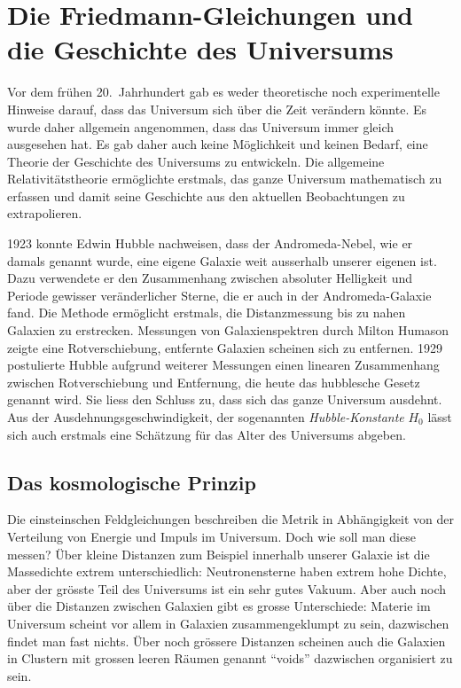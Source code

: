 %
%
\section{Die Friedmann-Gleichungen und die Geschichte des Universums
\label{buch:kruemmung:section:friedmann}}
%
Vor dem frühen 20.~Jahrhundert gab es weder theoretische noch experimentelle
Hinweise darauf, dass das Universum sich über die Zeit verändern könnte.
Es wurde daher allgemein angenommen, dass das Universum immer gleich
ausgesehen hat.
Es gab daher auch keine Möglichkeit und keinen Bedarf, eine Theorie der
Geschichte des Universums zu entwickeln.
Die allgemeine Relativitätstheorie ermöglichte erstmals, das ganze
Universum mathematisch zu erfassen und damit seine Geschichte aus
den aktuellen Beobachtungen zu extrapolieren.

1923 konnte Edwin Hubble nachweisen, dass der Andromeda-Nebel, wie
%
er damals genannt wurde, eine eigene Galaxie weit ausserhalb unserer
eigenen ist.
Dazu verwendete er den Zusammenhang zwischen absoluter Helligkeit
und Periode gewisser veränderlicher Sterne, die er auch in der
Andromeda-Galaxie fand.
%
Die Methode ermöglicht erstmals, die Distanzmessung bis zu nahen Galaxien
zu erstrecken.
Messungen von Galaxienspektren durch Milton Humason 
%
zeigte eine Rotverschiebung, entfernte Galaxien scheinen sich zu
%
entfernen.
1929 postulierte Hubble aufgrund weiterer Messungen einen linearen
Zusammenhang zwischen Rotverschiebung und Entfernung, die heute
das hubblesche Gesetz genannt wird.
%
%
Sie liess den Schluss zu, dass sich das ganze Universum ausdehnt.
Aus der Ausdehnungsgeschwindigkeit, der sogenannten 
\emph{Hubble-Konstante} $H_0$
%
lässt sich auch erstmals eine Schätzung für das Alter des Universums
abgeben.

%
%
\subsection{Das kosmologische Prinzip}
Die einsteinschen Feldgleichungen beschreiben die Metrik in Abhängigkeit
von der Verteilung von Energie und Impuls im Universum.
Doch wie soll man diese messen?
Über kleine Distanzen zum Beispiel innerhalb unserer Galaxie ist die
Massedichte extrem unterschiedlich:
Neutronensterne haben extrem hohe Dichte, aber der grösste Teil des
Universums ist ein sehr gutes Vakuum.
Aber auch noch über die Distanzen zwischen Galaxien gibt es grosse
Unterschiede: Materie im Universum scheint vor allem in Galaxien
zusammengeklumpt zu sein, dazwischen findet man fast nichts.
Über noch grössere Distanzen scheinen auch die Galaxien in Clustern
mit grossen leeren Räumen genannt ``voids'' dazwischen organisiert
zu sein.

